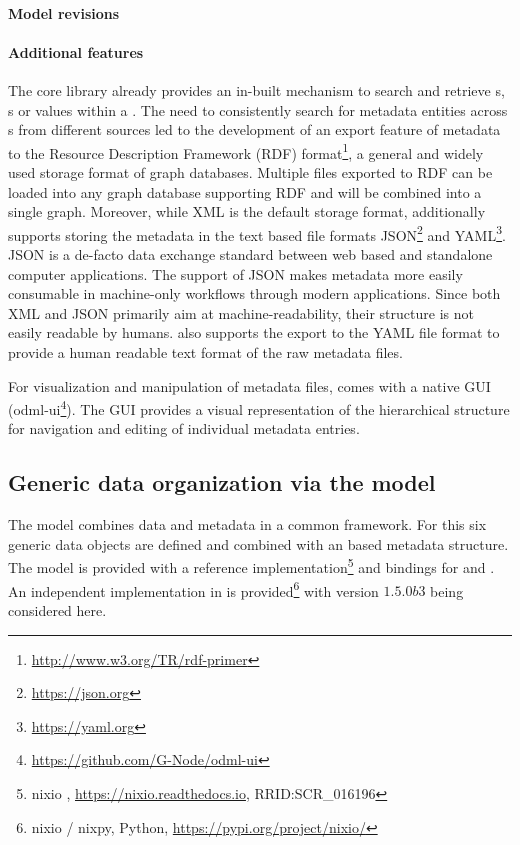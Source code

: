 \paragraph{Model revisions}
\label{sec:odml_model_revision}

\paragraph{Additional features}
The  core library already provides an in-built mechanism to search and retrieve s, s or values within a . The need to consistently search for metadata entities across s from different sources led to the development of an export feature of  metadata to the Resource Description Framework (RDF) format\footnote{\url{http://www.w3.org/TR/rdf-primer}}, a general and widely used storage format of graph databases. Multiple  files exported to RDF can be loaded into any graph database supporting RDF and will be combined into a single graph. Moreover, while XML is the default storage format,  additionally supports storing the metadata in the text based file formats JSON\footnote{\url{https://json.org}} and YAML\footnote{\url{https://yaml.org}}. JSON is a de-facto data exchange standard between web based and standalone computer applications. The support of JSON makes  metadata more easily consumable in machine-only workflows through modern applications. Since both XML and JSON primarily aim at machine-readability, their structure is not easily readable by humans.  also supports the export to the YAML file format to provide a human readable text format of the raw metadata files.

For visualization and manipulation of metadata files,  comes with a native  GUI (odml-ui\footnote{\url{https://github.com/G-Node/odml-ui}}). The GUI provides a visual representation of the hierarchical structure for navigation and editing of individual metadata entries.


\subsection{Generic data organization via the  model}
The  model combines data and metadata in a common framework. For this six generic data objects are defined and combined with an  based metadata structure. The  model is provided with a  reference implementation\footnote{nixio , \url{https://nixio.readthedocs.io},  RRID:SCR\_016196} and bindings for  and . An independent implementation in  is provided\footnote{nixio / nixpy, Python, \url{https://pypi.org/project/nixio/}} with version $1.5.0b3$ being considered here.


